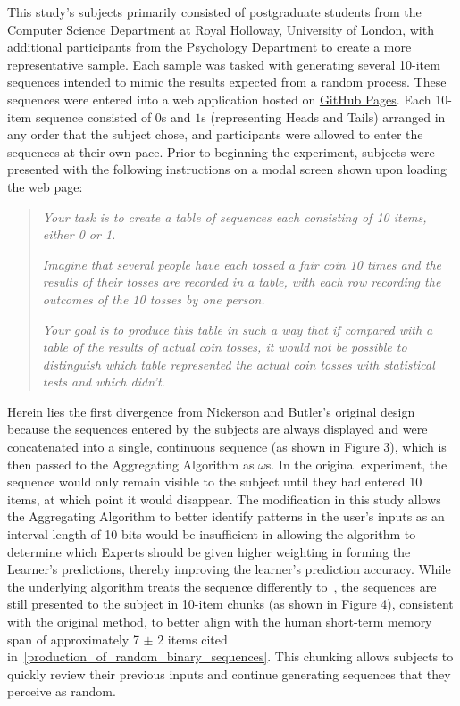 This study's subjects primarily consisted of postgraduate students from the Computer Science Department at Royal Holloway, University of London, with additional participants from the Psychology Department to create a more representative sample. Each sample was tasked with generating several 10-item sequences intended to mimic the results expected from a random process. These sequences were entered into a web application hosted on \href{https://arbarraclough.github.io/aggregating_algorithm/}{GitHub Pages}. Each 10-item sequence consisted of $0$s and $1$s (representing Heads and Tails) arranged in any order that the subject chose, and participants were allowed to enter the sequences at their own pace. Prior to beginning the experiment, subjects were presented with the following instructions on a modal screen shown upon loading the web page:

\begin{quote}
    \textit{Your task is to create a table of sequences each consisting of 10 items, either 0 or 1.}

    \textit{Imagine that several people have each tossed a fair coin 10 times and the results of their tosses are recorded in a table, with each row recording the outcomes of the 10 tosses by one person.}

    \textit{Your goal is to produce this table in such a way that if compared with a table of the results of actual coin tosses, it would not be possible to distinguish which table represented the actual coin tosses with statistical tests and which didn't.}
\end{quote}

\noindent Herein lies the first divergence from Nickerson and Butler's original design because the sequences entered by the subjects are always displayed and were concatenated into a single, continuous sequence (as shown in Figure 3), which is then passed to the Aggregating Algorithm as $\omega$s. In the original experiment, the sequence would only remain visible to the subject until they had entered 10 items, at which point it would disappear. The modification in this study allows the Aggregating Algorithm to better identify patterns in the user's inputs as an interval length of 10-bits would be insufficient in allowing the algorithm to determine which Experts should be given higher weighting in forming the Learner's predictions, thereby improving the learner's prediction accuracy. While the underlying algorithm treats the sequence differently to~\cite{nickerson:2009}, the sequences are still presented to the subject in 10-item chunks (as shown in Figure 4), consistent with the original method, to better align with the human short-term memory span of approximately 7 $\pm$ 2 items cited in~\ref{production_of_random_binary_sequences}. This chunking allows subjects to quickly review their previous inputs and continue generating sequences that they perceive as random.

